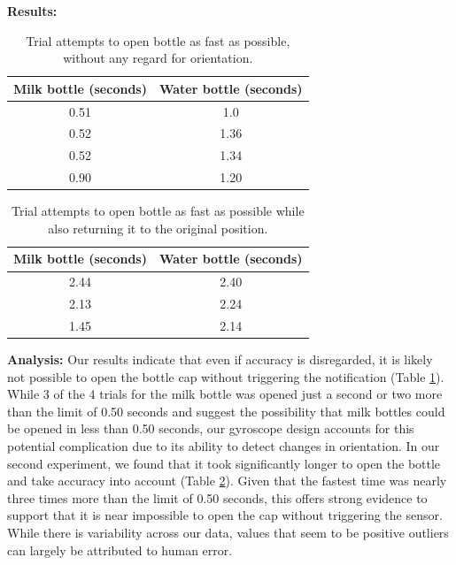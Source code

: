 \documentclass[12pt]{article}
\begin{document}
		\textbf{Results: }
		\begin{table}[H]
			\centering
			\begin{tabular}{|c|c|}
				\hline
				\textbf{Milk bottle (seconds)} & \textbf{Water bottle (seconds) } \\ \hline
				0.51 &1.0 \\ \hline
				0.52 & 1.36\\ \hline
				0.52&1.34\\ \hline
				0.90&1.20\\ \hline
			\end{tabular}

			\caption{Trial attempts to open bottle as fast as possible, without any regard for orientation.}
			\label{trial1}
		\end{table}
				\begin{table}[H]
			\centering
			\begin{tabular}{|c|c|}
				\hline
				\textbf{Milk bottle (seconds)} & \textbf{Water bottle (seconds) } \\ \hline
				2.44&
				2.40\\ \hline
				2.13&
				2.24\\ \hline
				1.45&
				2.14\\ \hline
			\end{tabular}

			\caption{Trial attempts to open bottle as fast as possible while also returning it to the original position.}
					\label{table:trial2}
		\end{table}

		\textbf{Analysis:} Our results indicate that even if accuracy is disregarded, it is likely not possible to open the bottle cap without triggering the notification (Table \ref{trial1}). While 3 of the 4 trials for the milk bottle was opened just a second or two more than the limit of 0.50 seconds and suggest the possibility that milk bottles could be opened in less than 0.50 seconds, our gyroscope design accounts for this potential complication due to its ability to detect changes in orientation. In our second experiment, we found that it took significantly longer to open the bottle and take accuracy into account (Table \ref{table:trial2}). Given that the fastest time was nearly three times more than the limit of 0.50 seconds, this offers strong evidence to support that it is near impossible to open the cap without triggering the sensor. While there is variability across our data, values that seem to be positive outliers can largely be attributed to human error.
		
\end{document}
